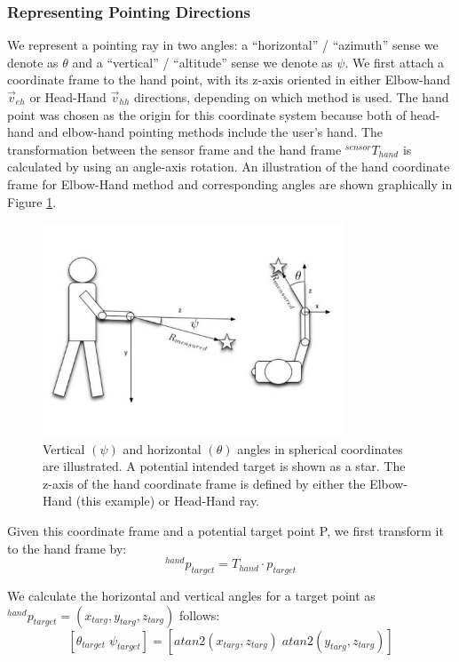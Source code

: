 \subsubsection{Representing Pointing Directions}
\label{sec:pointing_representing_pointing_directions}

We represent a pointing ray in two angles: a ``horizontal'' / ``azimuth'' sense we denote as $\theta$ and a ``vertical'' / ``altitude'' sense we denote as $\psi$. We first attach a coordinate frame to the hand point, with its z-axis oriented in either Elbow-hand $\vec{v}_{eh}$ or Head-Hand $\vec{v}_{hh}$ directions, depending on which method is used. The hand point was chosen as the origin for this coordinate system because both of head-hand and elbow-hand pointing methods include the user's hand. The transformation between the sensor frame and the hand frame $^{sensor}T_{hand}$ is calculated by using an angle-axis rotation. An illustration of the hand coordinate frame for Elbow-Hand method and corresponding angles are shown graphically in Figure \ref{fig:pointing_angle_errors}.

\begin{figure}[ht!]
\centering
\includegraphics[width=0.8\textwidth]{pics/person_angles_combined_2}
\caption{Vertical $(\psi)$ and horizontal $(\theta)$ angles in spherical coordinates are illustrated. A potential intended target is shown as a star. The z-axis of the hand coordinate frame is defined by either the Elbow-Hand (this example) or Head-Hand ray.}
\label{fig:pointing_angle_errors}
\end{figure}

Given this coordinate frame and a potential target point P, we first transform it to the hand frame by:
$$^{hand}p_{target} = T_{hand} \cdot p_{target}$$

We calculate the horizontal and vertical angles for a target point as $^{hand}p_{target} = (x_{targ}, y_{targ}, z_{targ})$ follows:
$$[\theta_{target}\;\psi_{target}]=[atan2(x_{targ}, z_{targ})\;atan2(y_{targ}, z_{targ})]$$

